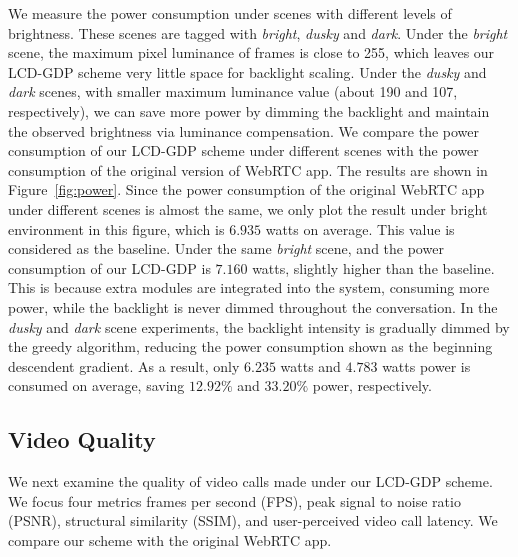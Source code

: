We measure the power consumption under scenes with different levels of
brightness.  These scenes are tagged with {\it bright}, {\it dusky}
and {\it dark}.  Under the {\it bright} scene, the maximum pixel
luminance of frames is close to 255, which leaves our LCD-GDP scheme
very little space for backlight scaling.  Under the {\it dusky} and
{\it dark} scenes, with smaller maximum luminance value (about 190 and
107, respectively), we can save more power by dimming the backlight
and maintain the observed brightness via luminance compensation.  We
compare the power consumption of our LCD-GDP scheme under different
scenes with the power consumption of the original version of WebRTC
app.  The results are shown in Figure~\ref{fig:power}.  Since the
power consumption of the original WebRTC app under different scenes is
almost the same, we only plot the result under bright environment in
this figure, which is $6.935$ watts on average.  This value is
considered as the baseline.  Under the same {\it bright} scene, and
the power consumption of our LCD-GDP is $7.160$ watts, slightly higher
than the baseline.  This is because extra modules are integrated into
the system, consuming more power, while the backlight is never dimmed
throughout the conversation.  In the {\it dusky} and {\it dark} scene
experiments, the backlight intensity is gradually dimmed by the greedy
algorithm, reducing the power consumption shown as the beginning
descendent gradient.  As a result, only $6.235$ watts and $4.783$
watts power is consumed on average, saving $12.92\%$ and $33.20\%$
power, respectively.
%

\subsection{Video Quality}

We next examine the quality of video calls made under our LCD-GDP
scheme. We focus four metrics frames per second (FPS), peak
signal to noise ratio (PSNR), structural similarity (SSIM), and user-perceived video call latency.
We compare our scheme with the original WebRTC app.

